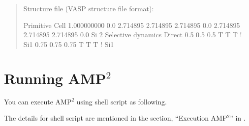 \documentclass[letterpaper,10pt,english]{sphinxmanual}
\begin{document}
\begin{quote}
\begin{sphinxVerbatim}[commandchars=\\\{\}]
                                  
                                  
\end{sphinxVerbatim}

Structure file (VASP structure file format):

\begin{sphinxVerbatim}[commandchars=\\\{\}]
Primitive Cell
   1.000000000
      0.0    2.714895    2.714895
      2.714895    0.0    2.714895
      2.714895    2.714895    0.0
    Si
    2
Selective dynamics
Direct
    0.5    0.5    0.5  T  T  T ! Si1
    0.75    0.75    0.75  T  T  T ! Si1
\end{sphinxVerbatim}
\end{quote}


\section{Running AMP$^{\text{2}}$}
\label{\detokenize{Overview/Overview:running-amp2}}
You can execute AMP$^{\text{2}}$ using shell script as following.

\begin{sphinxVerbatim}[commandchars=\\\{\}]
 
\end{sphinxVerbatim}

The details for shell script are mentioned in the section, “Execution AMP$^{\text{2}}$” in {\hyperref[\detokenize{Installation/Installation::doc}]{}}.
\end{document}
